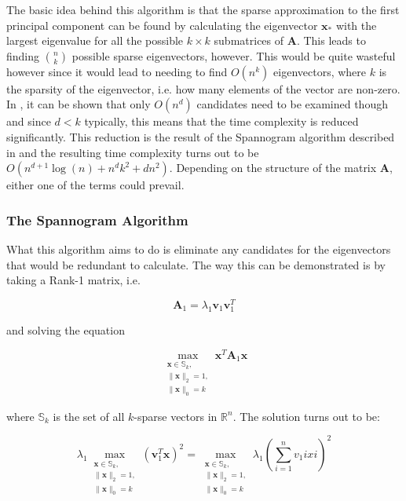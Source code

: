 \documentclass[11pt,a4paper]{article}
\begin{document}
The basic idea behind this algorithm is that the sparse approximation to the first principal component can be found by calculating the eigenvector $\mathbf{x}_*$ with the largest eigenvalue for all the possible $k\times k$ submatrices of $\mathbf{A}$. This leads to finding $n \choose k$ possible sparse eigenvectors, however. This would be quite wasteful however since it would lead to needing to find $O\left( n^k\right)$ eigenvectors, where $k$ is the sparsity of the eigenvector, i.e. how many elements of the vector are non-zero. In \cite{dimakis}, it can be shown that only $O\left(n^d\right)$ candidates need to be examined though and since $d < k$ typically, this means that the time complexity is reduced significantly. This reduction is the result of the Spannogram algorithm described in \cite{dimakis} and the resulting time complexity turns out to be $O \left( n^{d+1}\log(n) + n^d k^2 + dn^2\right)$. Depending on the structure of the matrix $\mathbf{A}$, either one of the terms could prevail.

\subsubsection{The Spannogram Algorithm}

What this algorithm aims to do is eliminate any candidates for the eigenvectors that would be redundant to calculate. The way this can be demonstrated is by taking a Rank-1 matrix, i.e.

\begin{equation*}
\mathbf{A}_1 = \lambda_1 \mathbf{v}_1 \mathbf{v}_1^T
\end{equation*}

and solving the equation

\begin{equation*}
\max_{\substack{\mathbf{x} \in\mathbb{S}_k, \\ \|\mathbf{x}\|_2 = 1, \\ \|\mathbf{x}\|_0 = k}} \mathbf{x}^T\mathbf{A}_1\mathbf{x}
\end{equation*}

where $\mathbb{S}_k$ is the set of all $k$-sparse vectors in $\mathbb{R}^n$. The solution turns out to be:

\begin{equation*}
\lambda_1\max_{\substack{\mathbf{x} \in\mathbb{S}_k, \\ \|\mathbf{x}\|_2 = 1, \\ \|\mathbf{x}\|_0 = k}} \left(\mathbf{v}_1^T \mathbf{x}\right)^2 = \max_{\substack{\mathbf{x} \in\mathbb{S}_k, \\ \|\mathbf{x}\|_2 = 1, \\ \|\mathbf{x}\|_0 = k}} \lambda_1\left( \sum_{i = 1}^n v_1i xi\right)^2
\end{equation*}
\end{document}
